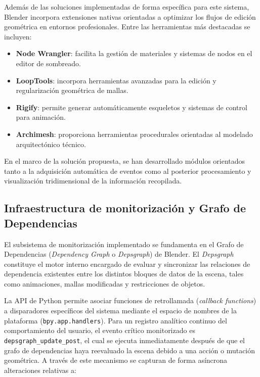 Además de las soluciones implementadas de forma específica para este sistema, Blender incorpora extensiones nativas orientadas a optimizar los flujos de edición geométrica en entornos profesionales. Entre las herramientas más destacadas se incluyen:

\begin{itemize}
\item \textbf{Node Wrangler}: facilita la gestión de materiales y sistemas de nodos en el editor de sombreado.
\item \textbf{LoopTools}: incorpora herramientas avanzadas para la edición y regularización geométrica de mallas.
\item \textbf{Rigify}: permite generar automáticamente esqueletos y sistemas de control para animación.
\item \textbf{Archimesh}: proporciona herramientas procedurales orientadas al modelado arquitectónico técnico.
\end{itemize}

En el marco de la solución propuesta, se han desarrollado módulos orientados tanto a la adquisición automática de eventos como al posterior procesamiento y visualización tridimensional de la información recopilada.

\subsection{Infraestructura de monitorización y Grafo de Dependencias}

El subsistema de monitorización implementado se fundamenta en el Grafo de Dependencias (\textit{Dependency Graph} o \textit{Depsgraph}) de Blender. El \textit{Depsgraph} constituye el motor interno encargado de evaluar y sincronizar las relaciones de dependencia existentes entre los distintos bloques de datos de la escena, tales como animaciones, mallas modificadas y restricciones de objetos.

La API de Python permite asociar funciones de retrollamada (\textit{callback functions}) a disparadores específicos del sistema mediante el espacio de nombres de la plataforma (\texttt{bpy.app.handlers}). Para un registro analítico continuo del comportamiento del usuario, el evento crítico monitorizado es \texttt{depsgraph\_update\_post}, el cual se ejecuta inmediatamente después de que el grafo de dependencias haya reevaluado la escena debido a una acción o mutación geométrica. A través de este mecanismo se capturan de forma asíncrona alteraciones relativas a:

